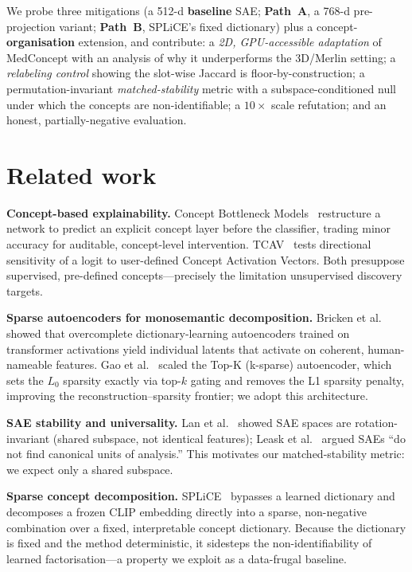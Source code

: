 \documentclass[sigconf, nonacm]{acmart}
\begin{document}
We probe three mitigations (a 512-d \textbf{baseline} SAE; \textbf{Path~A}, a 768-d pre-projection variant; \textbf{Path~B}, SPLiCE's fixed dictionary) plus a concept-\textbf{organisation} extension, and contribute: a \emph{2D, GPU-accessible adaptation} of MedConcept with an analysis of why it underperforms the 3D/Merlin setting; a \emph{relabeling control} showing the slot-wise Jaccard is floor-by-construction; a permutation-invariant \emph{matched-stability} metric with a subspace-conditioned null under which the concepts are non-identifiable; a $10{\times}$ scale refutation; and an honest, partially-negative evaluation.

\section{Related work}
\textbf{Concept-based explainability.} Concept Bottleneck Models~\cite{koh2020concept} restructure a network to predict an explicit concept layer before the classifier, trading minor accuracy for auditable, concept-level intervention. TCAV~\cite{kim2018tcav} tests directional sensitivity of a logit to user-defined Concept Activation Vectors. Both presuppose supervised, pre-defined concepts---precisely the limitation unsupervised discovery targets.

\textbf{Sparse autoencoders for monosemantic decomposition.} Bricken et al.~\cite{bricken2023monosemanticity} showed that overcomplete dictionary-learning autoencoders trained on transformer activations yield individual latents that activate on coherent, human-nameable features. Gao et al.~\cite{gao2024scaling} scaled the Top-K (k-sparse) autoencoder, which sets the $L_0$ sparsity exactly via top-$k$ gating and removes the L1 sparsity penalty, improving the reconstruction--sparsity frontier; we adopt this architecture.

\textbf{SAE stability and universality.} Lan et al.~\cite{lan2024universality} showed SAE spaces are rotation-invariant (shared subspace, not identical features); Leask et al.~\cite{leask2025canonical} argued SAEs ``do not find canonical units of analysis.'' This motivates our matched-stability metric: we expect only a shared subspace.

\textbf{Sparse concept decomposition.} SPLiCE~\cite{bhalla2024spliece} bypasses a learned dictionary and decomposes a frozen CLIP embedding directly into a sparse, non-negative combination over a fixed, interpretable concept dictionary. Because the dictionary is fixed and the method deterministic, it sidesteps the non-identifiability of learned factorisation---a property we exploit as a data-frugal baseline.
\end{document}
